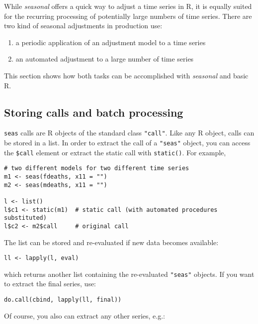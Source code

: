 While \emph{seasonal} offers a quick way to adjust a time series in R,
it is equally suited for the recurring processing of potentially large
numbers of time series. There are two kind of seasonal adjustments in
production use:

\begin{enumerate}
\def\labelenumi{\arabic{enumi}.}
\itemsep1pt\parskip0pt
\item
  a periodic application of an adjustment model to a time series
\item
  an automated adjustment to a large number of time series
\end{enumerate}

This section shows how both tasks can be accomplished with
\emph{seasonal} and basic R.

\subsection{Storing calls and batch
processing}\label{storing-calls-and-batch-processing}

\texttt{seas} calls are R objects of the standard class \texttt{"call"}.
Like any R object, calls can be stored in a list. In order to extract
the call of a \texttt{"seas"} object, you can access the \texttt{\$call}
element or extract the static call with \texttt{static()}. For example,

\begin{verbatim}
# two different models for two different time series
m1 <- seas(fdeaths, x11 = "")
m2 <- seas(mdeaths, x11 = "")

l <- list()
l$c1 <- static(m1)  # static call (with automated procedures substituted)
l$c2 <- m2$call     # original call
\end{verbatim}

The list can be stored and re-evaluated if new data becomes available:

\begin{verbatim}
ll <- lapply(l, eval)
\end{verbatim}

which returns another list containing the re-evaluated \texttt{"seas"}
objects. If you want to extract the final series, use:

\begin{verbatim}
do.call(cbind, lapply(ll, final))
\end{verbatim}

Of course, you also can extract any other series, e.g.:

